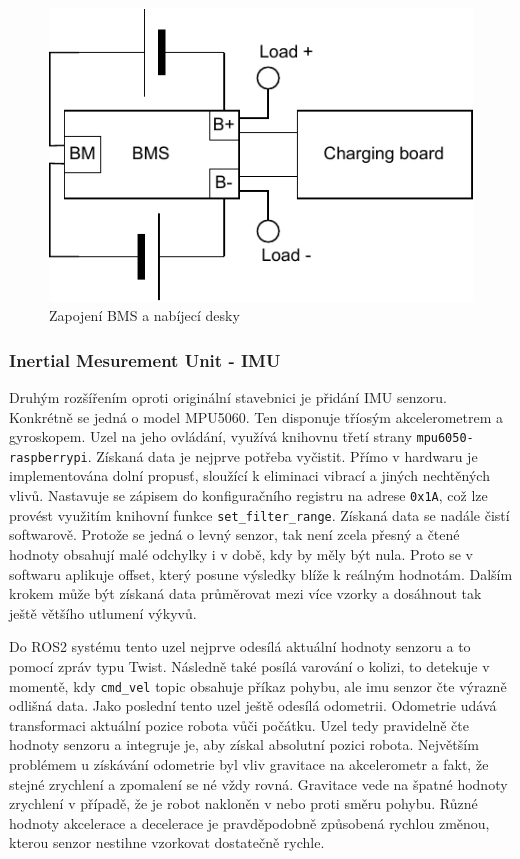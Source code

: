 \begin{figure}[h!]
	\centering
	\includegraphics[scale=0.75]{obrazky-figures/battery_circuite.pdf}
	\caption{Zapojení BMS a nabíjecí desky}
	\label{}
\end{figure}

\subsubsection*{Inertial Mesurement Unit - IMU}
Druhým rozšířením oproti originální stavebnici je přidání IMU senzoru. Konkrétně se jedná o model MPU5060. Ten disponuje tříosým akcelerometrem a gyroskopem. Uzel na jeho ovládání, využívá knihovnu třetí strany \verb|mpu6050-raspberrypi|. Získaná data je nejprve potřeba vyčistit. Přímo v hardwaru je implementována dolní propusť, sloužící k eliminaci vibrací a jiných nechtěných vlivů. Nastavuje se zápisem do konfiguračního registru na adrese \verb|0x1A|, což lze provést využitím knihovní funkce \verb|set_filter_range|. Získaná data se nadále čistí softwarově. Protože se jedná o levný senzor, tak není zcela přesný a čtené hodnoty obsahují malé odchylky i v době, kdy by měly být nula. Proto se v softwaru aplikuje offset, který posune výsledky blíže k reálným hodnotám. Dalším krokem může být získaná data průměrovat mezi více vzorky a dosáhnout tak ještě většího utlumení výkyvů. 

Do ROS2 systému tento uzel nejprve odesílá aktuální hodnoty senzoru a to pomocí zpráv typu Twist. Následně také posílá varování o kolizi, to detekuje v momentě, kdy \verb|cmd_vel| topic obsahuje příkaz pohybu, ale imu senzor čte výrazně odlišná data. Jako poslední tento uzel ještě odesílá odometrii. Odometrie udává transformaci aktuální pozice robota vůči počátku. Uzel tedy pravidelně čte hodnoty senzoru a integruje je, aby získal absolutní pozici robota. Největším problémem u získávání odometrie byl vliv gravitace na akcelerometr a fakt, že stejné zrychlení a zpomalení se né vždy rovná. Gravitace vede na špatné hodnoty zrychlení v případě, že je robot nakloněn v nebo proti směru pohybu. Různé hodnoty akcelerace a decelerace je pravděpodobně způsobená rychlou změnou, kterou senzor nestihne vzorkovat dostatečně rychle.

